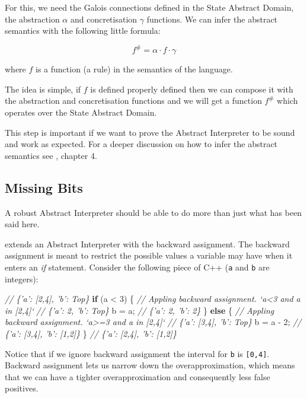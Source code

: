 \documentclass[
11pt, %
english, %
singlespacing, %
headsepline, %
]{MastersDoctoralThesis} %
\newenvironment{Shaded}{}{}
\newcommand{\CommentTok}[1]{\textcolor[rgb]{0.38,0.63,0.69}{\textit{#1}}}
\newcommand{\ControlFlowTok}[1]{\textcolor[rgb]{0.00,0.44,0.13}{\textbf{#1}}}
\newcommand{\DecValTok}[1]{\textcolor[rgb]{0.25,0.63,0.44}{#1}}
\newcommand{\NormalTok}[1]{#1}
\begin{document}
For this, we need the Galois connections defined in the State Abstract
Domain, the abstraction \(\alpha\) and concretisation \(\gamma\)
functions. We can infer the abstract semantics with the following little
formula:

\[f^\# = \alpha \cdot f \cdot \gamma\]

where \(f\) is a function (a rule) in the semantics of the language.

The idea is simple, if \(f\) is defined properly defined then we can
compose it with the abstraction and concretisation functions and we will
get a function \(f^\#\) which operates over the State Abstract Domain.

This step is important if we want to prove the Abstract Interpreter to
be sound and work as expected. For a deeper discussion on how to infer
the abstract semantics see \textcite{nielson2015principles}, chapter 4.

\hypertarget{missing-bits}{%
\subsection{Missing Bits}\label{missing-bits}}

A robust Abstract Interpreter should be able to do more than just what
has been said here.

\textcite{mine_weakly_2004} extends an Abstract Interpreter with the
backward assignment. The backward assignment is meant to restrict the
possible values a variable may have when it enters an \emph{if}
statement. Consider the following piece of C++ (\texttt{a} and
\texttt{b} are integers):

\begin{Shaded}
\begin{Highlighting}[]
\CommentTok{// \{'a': [2,4], 'b': Top\}}
\ControlFlowTok{if}\NormalTok{ (a < }\DecValTok{3}\NormalTok{) \{}
  \CommentTok{// Appling backward assignment. `a<3 and a in [2,4]`}
  \CommentTok{// \{'a': 2, 'b': Top\}}
\NormalTok{  b = a;}
  \CommentTok{// \{'a': 2, 'b': 2\}}
\NormalTok{\} }\ControlFlowTok{else}\NormalTok{ \{}
  \CommentTok{// Appling backward assignment. `a>=3 and a in [2,4]`}
  \CommentTok{// \{'a': [3,4], 'b': Top\}}
\NormalTok{  b = a - }\DecValTok{2}\NormalTok{;}
  \CommentTok{// \{'a': [3,4], 'b': [1,2]\}}
\NormalTok{\}}
\CommentTok{// \{'a': [2,4], 'b': [1,2]\}}
\end{Highlighting}
\end{Shaded}

Notice that if we ignore backward assignment the interval for \texttt{b}
is \texttt{{[}0,4{]}}. Backward assignment lets us narrow down the
overapproximation, which means that we can have a tighter
overapproximation and consequently less false positives.
\end{document}
